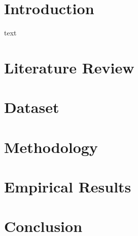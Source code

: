 \documentclass[a4paper,12pt,twoside]{article}
\begin{document}
    \setcounter{page}{1}
	\tableofcontents
	
	\clearpage
	\listoffigures
	
	\listoftables
	
	\clearpage
    \setcounter{page}{1}
    \setlength{\parindent}{0pt}
    \setlength{\parskip}{8pt}

\section{Introduction}
	text

\newpage
\section{Literature Review}

\newpage
\section{Dataset}

\newpage
\section{Methodology}

\newpage
\section{Empirical Results}

\newpage
\section{Conclusion}



\clearpage


	
	
\end{document}
